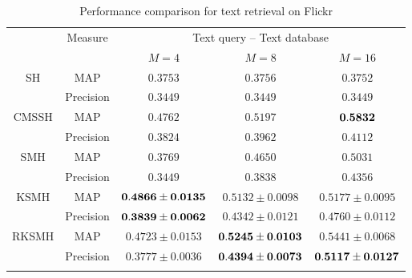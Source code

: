 \begin{table}[htb]\small
\caption{Performance comparison for text retrieval on \mbox{Flickr}}\label{table:comp-flickr-uni-tt}\vspace{-0.5cm}
\begin{center}
\begin{tabular}{|c|c|c|c|c|}
\toprule[1pt]\addlinespace[0pt]
    \multirow{2}{*}{Method}&  \multirow{2}{*}{Measure} &  \multicolumn{3}{|c|}{Text query -- Text database}\\
\cline{3-5}%
&&$M=4$&$M=8$&$M=16$\\
\hline
\multirow{2}{*}{SH}&{MAP}    & $0.3753$ & $0.3756$&$ 0.3752 $\\
\cline{2-5}%
&{Precision}    &      $0.3449$         &$0.3449$&$0.3449$\\
\hline %
\multirow{2}{*}{CMSSH}&{MAP}  &$0.4762 $&$   0.5197   $&$  {\bf 0.5832 } $ \\
\cline{2-5}%
&{Precision}  & $0.3824  $&$   0.3962   $&$   0.4112 $\\
\hline%
\multirow{2}{*}{SMH}&MAP &$0.3769 $&$    0.4650   $&$   0.5031 $\\
\cline{2-5}%
&{Precision}    &$ 0.3449 $&$    0.3838   $&$   0.4356  $\\
\hline%
\multirow{2}{*}{KSMH}&MAP       & $ {\bf 0.4866      \pm0.0135}$&$ 0.5132  \pm    0.0098    $&$ 0.5177\pm   0.0095  $\\
\cline{2-5}%
&{Precision}     & ${\bf 0.3839   \pm0.0062 } $&$    0.4342  \pm   0.0121   $& $ 0.4760\pm  0.0112  $\\
\hline%
\multirow{2}{*}{RKSMH}&MAP      & $0.4723  \pm0.0153  $&$ {\bf 0.5245  \pm  0.0103 }     $&$   0.5441\pm  0.0068  $\\
\cline{2-5}%
&{Precision}       &$0.3777  \pm 0.0036 $&$  {\bf 0.4394 \pm   0.0073 }    $&$ {\bf  0.5117\pm  0.0127 }  $\\
\addlinespace[0pt]\bottomrule[1pt]
\end{tabular}
\end{center}
\end{table}

